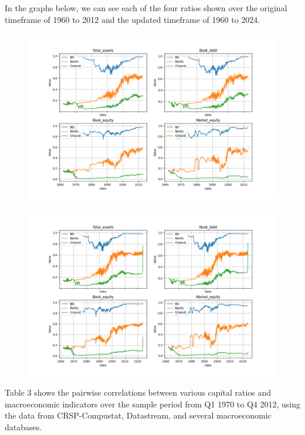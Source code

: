 \documentclass{article}
\begin{document}
\clearpage
In the graphs below, we can see each of the four ratios shown over the original timeframe of 1960 to 2012 and the updated timeframe of 1960 to 2024.\clearpage

\begin{figure}[htbp]\centering\includegraphics[width=\linewidth]{table02_figure.png}\end{figure}\par
\begin{figure}[htbp]\centering\includegraphics[width=\linewidth]{updated_table02_figure.png}\end{figure}\par
\clearpage

Table 3 shows the pairwise correlations between various capital ratios and macroeconomic indicators over the sample period from Q1 1970 to Q4 2012, using the data from CRSP-Compustat, Datastream, and several macroeconomic databases. 
\end{document}
